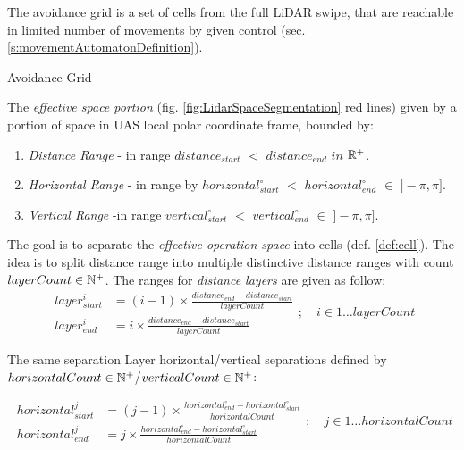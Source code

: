 \begin{note} The avoidance grid is a set of cells from the full LiDAR swipe, that are reachable in limited number of movements by given control (sec. \ref{s:movementAutomatonDefinition}).
\end{note} 

\begin{definition}{Avoidance Grid}\label{def:AvoidanceGrid} 


\noindent The \emph{effective space portion} (fig. \ref{fig:LidarSpaceSegmentation} red lines) given by a portion of space in UAS local polar coordinate frame, bounded by:
    \begin{enumerate}
        \item \emph{Distance Range} -  in range $distance_{start}$ $<$ $distance_{end}$ $in$ $\mathbb{R}^+$.
        \item \emph{Horizontal Range} - in range by $horizontal^\circ_{start}$ $<$ $horizontal^\circ_{end}$ $\in$ $]-\pi,\pi]$.
        \item \emph{Vertical Range} -in range $vertical^\circ_{start}$ $<$ $vertical^\circ_{end}$ $\in$ $]-\pi,\pi]$.
    \end{enumerate}

\noindent The goal is to separate the \emph{effective operation space} into cells (def. \ref{def:cell}). The idea is to split distance range into multiple distinctive distance ranges with count $layerCount \in \mathbb{N}^+$.  The ranges for \emph{distance layers} are given as follow:
\begin{equation}\label{eq:avoidanceGridCellDistanceRange}
    \begin{aligned}
        layer^i_{start} & = (i-1)\times\frac{distance_{end}-distance_{start}}{layer Count}\\
        layer^i_{end} & = i\times\frac{distance_{end}-distance_{start}}{layer Count}
    \end{aligned};\quad i\in 1\dots layer Count
\end{equation}

\noindent The same separation Layer horizontal/vertical separations defined by $horizontal Count \in \mathbb{N}^+$/$vertical Count \in \mathbb{N}^+$:

\begin{equation}\label{eq:avoidanceGridCellHorizontalRange}
    \begin{aligned}
        horizontal^j_{start} & = (j-1)\times\frac{horizontal^\circ_{end}-horizontal^\circ_{start}}{horizontal Count}\\
        horizontal^j_{end} & = j\times\frac{horizontal^\circ_{end}-horizontal^\circ_{start}}{horizontal Count}
    \end{aligned};\quad j\in 1\dots horizontal Count
\end{equation}



\end{definition}
